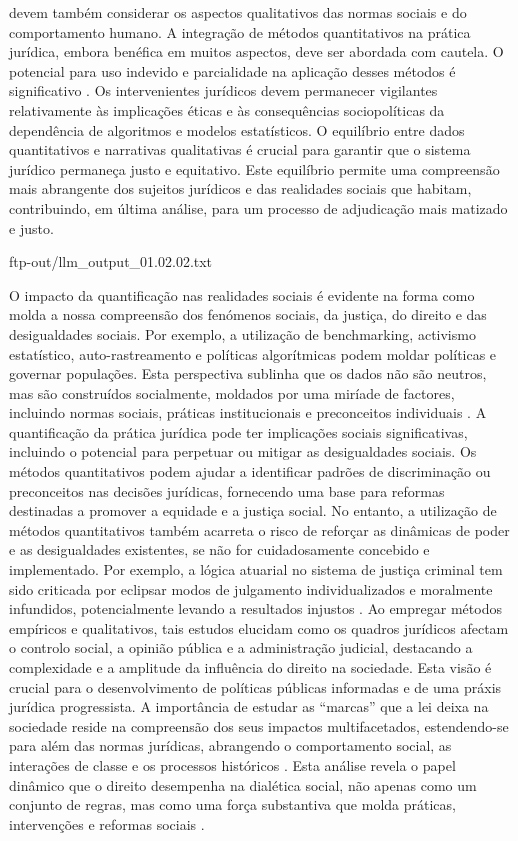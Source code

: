 devem também considerar os aspectos qualitativos das normas sociais e do comportamento humano. A integração de métodos quantitativos na prática jurídica, embora benéfica em muitos aspectos, deve ser abordada com cautela. O potencial para uso indevido e parcialidade na aplicação desses métodos é significativo \cite{jurimetricschallenges}. Os intervenientes jurídicos devem permanecer vigilantes relativamente às implicações éticas e às consequências sociopolíticas da dependência de algoritmos e modelos estatísticos. O equilíbrio entre dados quantitativos e narrativas qualitativas é crucial para garantir que o sistema jurídico permaneça justo e equitativo. Este equilíbrio permite uma compreensão mais abrangente dos sujeitos jurídicos e das realidades sociais que habitam, contribuindo, em última análise, para um processo de adjudicação mais matizado e justo. 

ftp-out/llm_output_01.02.02.txt 

O impacto da quantificação nas realidades sociais é evidente na forma como molda a nossa compreensão dos fenómenos sociais, da justiça, do direito e das desigualdades sociais. Por exemplo, a utilização de benchmarking, activismo estatístico, auto-rastreamento e políticas algorítmicas podem moldar políticas e governar populações. Esta perspectiva sublinha que os dados não são neutros, mas são construídos socialmente, moldados por uma miríade de factores, incluindo normas sociais, práticas institucionais e preconceitos individuais \cite{101057s4159902003965}. A quantificação da prática jurídica pode ter implicações sociais significativas, incluindo o potencial para perpetuar ou mitigar as desigualdades sociais. Os métodos quantitativos podem ajudar a identificar padrões de discriminação ou preconceitos nas decisões jurídicas, fornecendo uma base para reformas destinadas a promover a equidade e a justiça social. No entanto, a utilização de métodos quantitativos também acarreta o risco de reforçar as dinâmicas de poder e as desigualdades existentes, se não for cuidadosamente concebido e implementado. Por exemplo, a lógica atuarial no sistema de justiça criminal tem sido criticada por eclipsar modos de julgamento individualizados e moralmente infundidos, potencialmente levando a resultados injustos \cite{101111lsi12334}. Ao empregar métodos empíricos e qualitativos, tais estudos elucidam como os quadros jurídicos afectam o controlo social, a opinião pública e a administração judicial, destacando a complexidade e a amplitude da influência do direito na sociedade. Esta visão é crucial para o desenvolvimento de políticas públicas informadas e de uma práxis jurídica progressista. A importância de estudar as “marcas” que a lei deixa na sociedade reside na compreensão dos seus impactos multifacetados, estendendo-se para além das normas jurídicas, abrangendo o comportamento social, as interações de classe e os processos históricos \cite{law1982, calvo2024}. Esta análise revela o papel dinâmico que o direito desempenha na dialética social, não apenas como um conjunto de regras, mas como uma força substantiva que molda práticas, intervenções e reformas sociais \cite{law1982}. 

